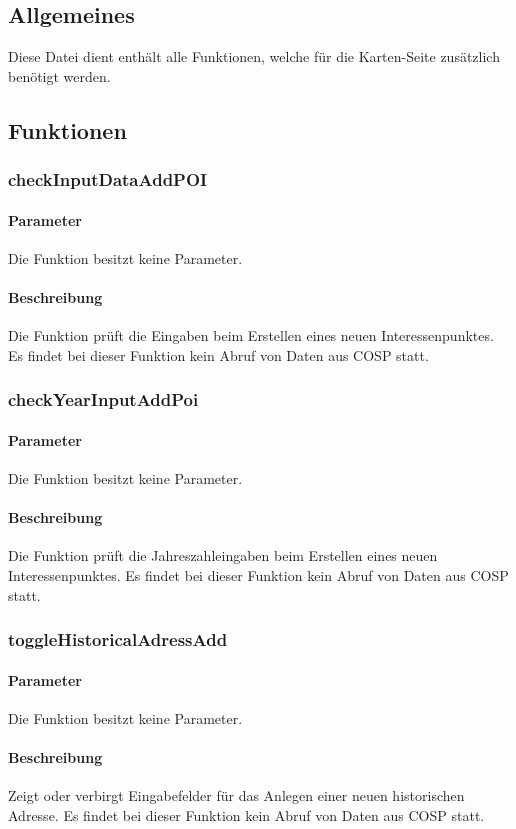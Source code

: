 \subsection{Allgemeines} Diese Datei dient enthält alle Funktionen, welche für die Karten-Seite zusätzlich benötigt werden.
\newpage
\subsection{Funktionen}
\subsubsection{checkInputDataAddPOI}
\paragraph{Parameter} Die Funktion besitzt keine Parameter.
\paragraph{Beschreibung} Die Funktion prüft die Eingaben beim Erstellen eines neuen Interessenpunktes. Es findet bei dieser Funktion kein Abruf von Daten aus {\glqq COSP\grqq} statt.
\subsubsection{checkYearInputAddPoi}
\paragraph{Parameter} Die Funktion besitzt keine Parameter.
\paragraph{Beschreibung} Die Funktion prüft die Jahreszahleingaben beim Erstellen eines neuen Interessenpunktes. Es findet bei dieser Funktion kein Abruf von Daten aus {\glqq COSP\grqq} statt.
\subsubsection{toggleHistoricalAdressAdd}
\paragraph{Parameter} Die Funktion besitzt keine Parameter.
\paragraph{Beschreibung} Zeigt oder verbirgt Eingabefelder für das Anlegen einer neuen historischen Adresse. Es findet bei dieser Funktion kein Abruf von Daten aus {\glqq COSP\grqq} statt.